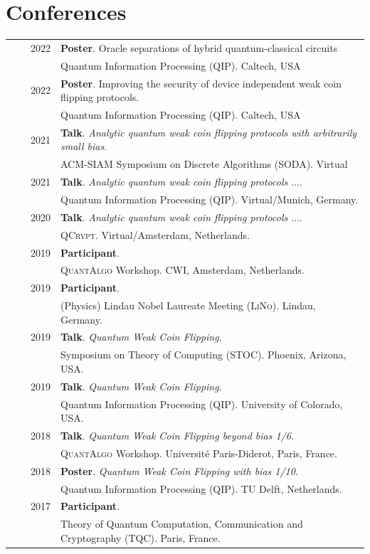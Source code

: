 \documentclass[a4paper,10pt]{article}
\begin{document}
\section{Conferences}
\begin{longtable}{rrp{11cm}}
  & ~~2022 &\textbf{Poster}. Oracle separations of hybrid quantum-classical circuits\\
  &         &Quantum Information Processing (\textsc{QIP}). Caltech, USA\\
  & ~~2022 &\textbf{Poster}. Improving the security of device independent weak coin flipping protocols.\\
  &         &Quantum Information Processing (\textsc{QIP}). Caltech, USA\\  
  & ~~2021 &\textbf{Talk}. \emph{Analytic quantum weak coin flipping protocols with arbitrarily small bias}. \\
  &         &ACM-SIAM Symposium on Discrete Algorithms (\textsc{SODA}). Virtual\\    
  & ~~2021 &\textbf{Talk}. \emph{Analytic quantum weak coin flipping protocols $\dots$}. \\
  &         &Quantum Information Processing (\textsc{QIP}). Virtual/Munich, Germany.\\  
  & ~~2020 &\textbf{Talk}. \emph{Analytic quantum weak coin flipping protocols $\dots$}. \\
  &         &\textsc{QCrypt}. Virtual/Amsterdam, Netherlands.\\
  & ~~2019  &\textbf{Participant}. \\
  & ~~~~~~ &\textsc{QuantAlgo} Workshop. CWI, Amsterdam, Netherlands.\\
  & ~~2019 &\textbf{Participant}. \\
  & ~~~~~~ &(Physics) Lindau Nobel Laureate Meeting (\textsc{LiNo}). Lindau, Germany. \\
  & ~~2019 &\textbf{Talk}. \emph{Quantum Weak Coin Flipping}. \\
  & ~~~~~~ &Symposium on Theory of Computing (\textsc{STOC}). Phoenix, Arizona, USA. \\
  & ~~2019 &\textbf{Talk}. \emph{Quantum Weak Coin Flipping}. \\
  & ~~~~~~ &Quantum Information Processing (\textsc{QIP}). University of Colorado, USA. \\
  & ~~2018 &\textbf{Talk}. \emph{Quantum Weak Coin Flipping beyond bias 1/6}. \\  
  & ~~~~~~ &\textsc{QuantAlgo} Workshop. Université Paris-Diderot, Paris, France. \\
  & ~~2018 &\textbf{Poster}. \emph{Quantum Weak Coin Flipping with bias 1/10}. \\
  & ~~~~~~ &Quantum Information Processing (\textsc{QIP}). TU Delft, Netherlands. \\
  & ~~2017 &\textbf{Participant}. \\
  & ~~~~~~ &Theory of Quantum Computation, Communication and Cryptography (\textsc{TQC}). Paris, France.
  \end{longtable}
\end{document}
